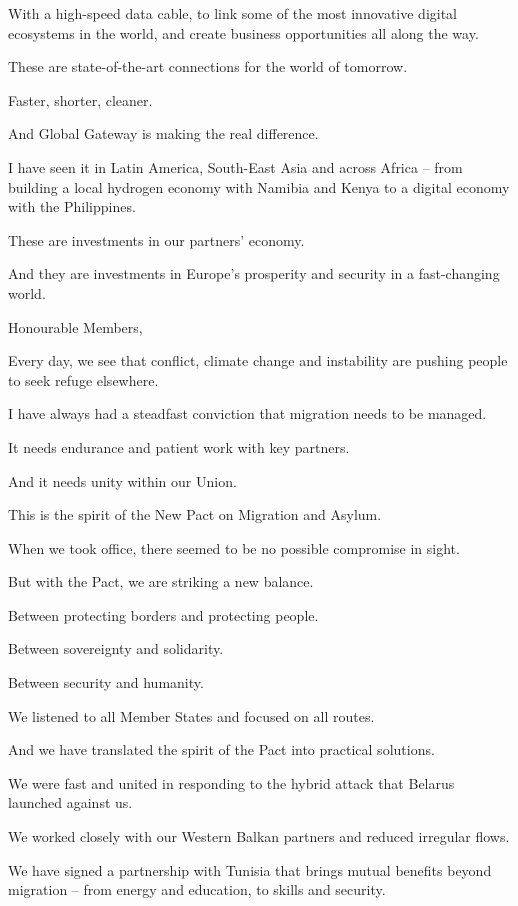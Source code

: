 \documentclass[a4paper,11pt]{article}
\begin{document}
With a high-speed data cable, to link some of the most innovative digital ecosystems in the world, and create business opportunities all along the way.

These are state-of-the-art connections for the world of tomorrow.

Faster, shorter, cleaner.

And Global Gateway is making the real difference.

I have seen it in Latin America, South-East Asia and across Africa – from building a local hydrogen economy with Namibia and Kenya to a digital economy with the Philippines.

These are investments in our partners' economy.

And they are investments in Europe's prosperity and security in a fast-changing world.

 

Honourable Members,

Every day, we see that conflict, climate change and instability are pushing people to seek refuge elsewhere.

I have always had a steadfast conviction that migration needs to be managed.

It needs endurance and patient work with key partners.

And it needs unity within our Union.

This is the spirit of the New Pact on Migration and Asylum.

When we took office, there seemed to be no possible compromise in sight.

But with the Pact, we are striking a new balance.

Between protecting borders and protecting people.

Between sovereignty and solidarity.

Between security and humanity.

We listened to all Member States and focused on all routes.

And we have translated the spirit of the Pact into practical solutions.

We were fast and united in responding to the hybrid attack that Belarus launched against us.

We worked closely with our Western Balkan partners and reduced irregular flows.

We have signed a partnership with Tunisia that brings mutual benefits beyond migration – from energy and education, to skills and security.
\end{document}
